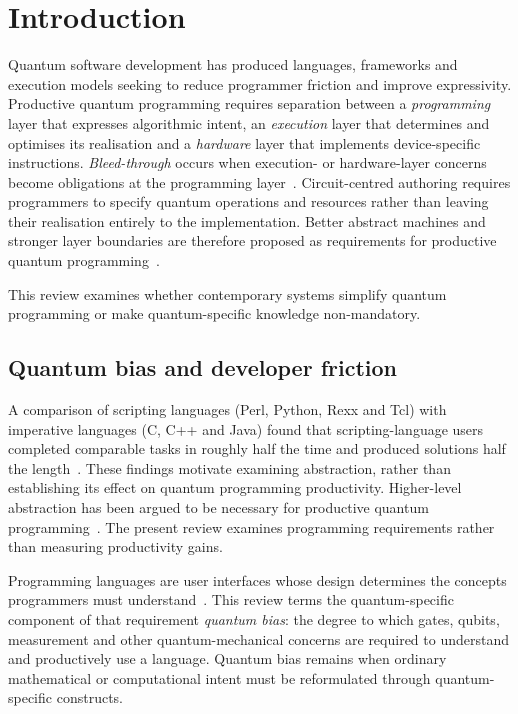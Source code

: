 \section{Introduction}\label{sec:introduction}
Quantum software development has produced languages, frameworks and execution models seeking to reduce programmer friction and improve expressivity.
Productive quantum programming requires separation between a \textit{programming} layer that expresses algorithmic intent, an \textit{execution} layer that determines and optimises its realisation and a \textit{hardware} layer that implements device-specific instructions.
\textit{Bleed-through} occurs when execution- or hardware-layer concerns become obligations at the programming layer~\cite{DiMatteo2024AbstractionHierarchy}.
Circuit-centred authoring requires programmers to specify quantum operations and resources rather than leaving their realisation entirely to the implementation.
Better abstract machines and stronger layer boundaries are therefore proposed as requirements for productive quantum programming~\cite{nunez_corrales2025betterabstractmachines}.

This review examines whether contemporary systems simplify quantum programming or make quantum-specific knowledge non-mandatory.

\subsection{Quantum bias and developer friction}\label{subsec:introduction:quantum_bias}
A comparison of scripting languages (Perl, Python, Rexx and Tcl) with imperative languages (C, C++ and Java) found that scripting-language users completed comparable tasks in roughly half the time and produced solutions half the length~\cite{Prechelt2000EmpiricalComparison}.
These findings motivate examining abstraction, rather than establishing its effect on quantum programming productivity.
Higher-level abstraction has been argued to be necessary for productive quantum programming~\cite{cobb2022higherlevelabstractions}.
The present review examines programming requirements rather than measuring productivity gains.

Programming languages are user interfaces whose design determines the concepts programmers must understand~\cite{Myers2016PLUsabilitySIG}.
This review terms the quantum-specific component of that requirement \textit{quantum bias}: the degree to which gates, qubits, measurement and other quantum-mechanical concerns are required to understand and productively use a language.
Quantum bias remains when ordinary mathematical or computational intent must be reformulated through quantum-specific constructs.

